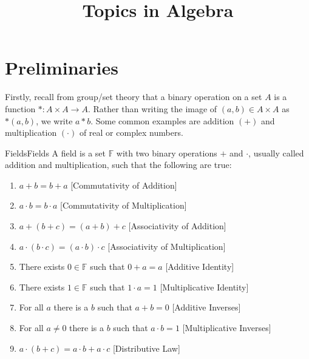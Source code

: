\documentclass[crop=false,class=article]{standalone}                           %
\begin{document}
    \title{Topics in Algebra}
    \author{}
    \date{\vspace{-5ex}}
    \maketitle
    \tableofcontents
    \clearpage
    \section{Preliminaries}
        Firstly, recall from group/set theory that a binary operation on a
        set $A$ is a function $*:A\times{A}\rightarrow{A}$. Rather than
        writing the image of $(a,b)\in{A}\times{A}$ as $*(a,b)$, we write
        $a*b$. Some common examples are addition $(+)$ and multiplication
        $(\cdot)$ of real or complex numbers.
        \begin{fdefinition}{Fields}{Fields}
            A field is a set $\mathbb{F}$ with two binary operations $+$ and
            $\cdot$, usually called addition and multiplication, such that
            the following are true:
            \begin{enumerate}
                \item $a+b=b+a$
                      \hfill[Commutativity of Addition]
                \item $a\cdot{b}=b\cdot{a}$
                      \hfill[Commutativity of Multiplication]
                \item $a+(b+c)=(a+b)+c$
                      \hfill[Associativity of Addition]
                \item $a\cdot(b\cdot{c})=(a\cdot{b})\cdot{c}$
                      \hfill[Associativity of Multiplication]
                \item There exists $0\in\mathbb{F}$ such that $0+a=a$
                      \hfill[Additive Identity]
                \item There exists $1\in\mathbb{F}$ such that $1\cdot{a}=1$
                      \hfill[Multiplicative Identity]
                \item For all $a$ there is a $b$ such that $a+b=0$
                      \hfill[Additive Inverses]
                \item For all $a\ne{0}$ there is a $b$ such that
                      $a\cdot{b}=1$
                      \hfill[Multiplicative Inverses]
                \item $a\cdot(b+c)=a\cdot{b}+a\cdot{c}$
                      \hfill[Distributive Law]
            \end{enumerate}
        \end{fdefinition}
\end{document}
